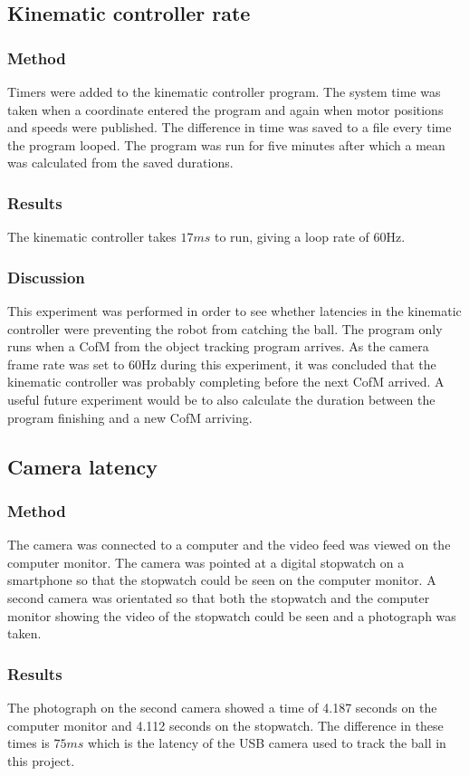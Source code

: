 \documentclass[conference]{IEEEtran}
\begin{document}
	
	\subsection{Kinematic controller rate}
	\subsubsection{Method}
	Timers were added to the kinematic controller program. The system time was taken when a coordinate entered the program and again when motor positions and speeds were published. The difference in time was saved to a file every time the program looped. The program was run for five minutes after which a mean was calculated from the saved durations.
	\subsubsection{Results}
	The kinematic controller takes $17ms$ to run, giving a loop rate of 60Hz.
	\subsubsection{Discussion}
	This experiment was performed in order to see whether latencies in the kinematic controller were preventing the robot from catching the ball. The program only runs when a CofM from the object tracking program arrives. As the camera frame rate was set to 60Hz during this experiment, it was concluded that the kinematic controller was probably completing before the next CofM arrived. A useful future experiment would be to also calculate the duration between the program finishing and a new CofM arriving. 
	
		\subsection{Camera latency}
		\subsubsection{Method}
		The camera was connected to a computer and the video feed was viewed on the computer monitor. The camera was pointed at a digital stopwatch on a smartphone so that the stopwatch could be seen on the computer monitor. A second camera was orientated so that both the stopwatch and the computer monitor showing the video of the stopwatch could be seen and a photograph was taken. 
		\subsubsection{Results}
		The photograph on the second camera showed a time of 4.187 seconds on the computer monitor and 4.112 seconds on the stopwatch. The difference in these times is $75ms$ which is the latency of the USB camera used to track the ball in this project.
\end{document}
